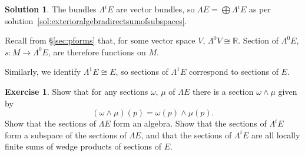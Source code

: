 \documentclass[11pt, a4paper]{report}
\theoremstyle{definition}
\newtheorem{exercise}{Exercise}[part]
\newtheorem{solution}{Solution}[part]
\newenvironment{ex}{\begin{exercise}}{\end{exercise}\pagebreak[1]}
\newenvironment{sol}{\begin{solution}}{\end{solution}\pagebreak[3]}
\begin{document}
\begin{sol}

The bundles $\Lambda^i E$ are vector bundles, so $\Lambda E = \bigoplus \Lambda^i E$ as per solution~\ref{sol:exterioralgebradirectsumofsubspaces}.

Recall from \S\ref{sec:pforms} that, for some vector space $V$, $\Lambda^0 V \cong \mathbb{R}$.
Section of $\Lambda^0 E$, $s: M \to \Lambda^0 E$, are therefore functions on $M$.

Similarly, we identify $\Lambda^1 E \cong E$, so sections of $\Lambda^1 E$ correspond to sections of $E$.

\end{sol}

\begin{ex}

Show that for any sections $\omega$, $\mu$ of $\Lambda E$ there is a section $\omega \wedge \mu$ given by
\[
    (\omega \wedge \mu)(p) = \omega(p) \wedge \mu(p).
\]
Show that the sections of $\Lambda E$ form an algebra.
Show that the sections of $\Lambda^i E$ form a subspace of the sections of $\Lambda E$, and that the sections of $\Lambda^i E$ are all locally finite sums of wedge products of sections of $E$.

\end{ex}
\end{document}

